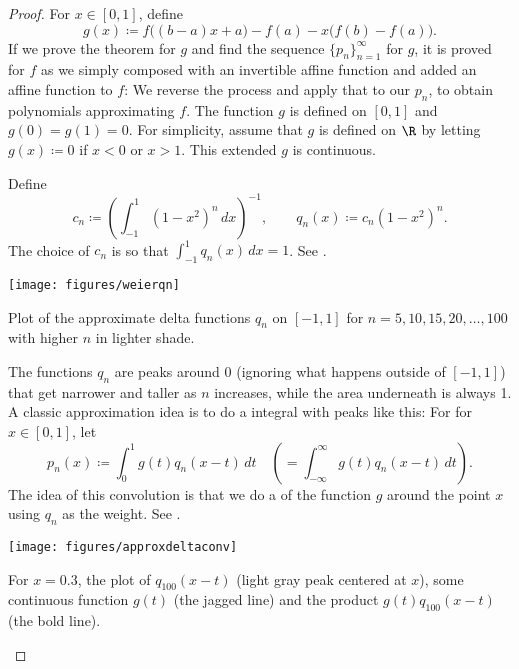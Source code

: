 \begin{proof}
For $x \in [0,1]$,
define
\begin{equation*}
g(x) \coloneqq f\bigl((b-a)x+a\bigr)-f(a) - x\bigl(f(b)-f(a)\bigr) .
\end{equation*}
If we prove the theorem for $g$ and find the sequence
$\{ p_n \}_{n=1}^\infty$ for $g$,
it is proved for $f$ as we simply
composed with an invertible affine function and added an affine
function to $f$:  We reverse the process and apply that to our
$p_n$, to obtain polynomials approximating $f$.
The function $g$ is defined on $[0,1]$ and $g(0)=g(1)=0$.
For simplicity, assume that
$g$ is defined on $\R$ by letting
$g(x) \coloneqq 0$ if $x < 0$ or $x > 1$.  This extended $g$ is continuous.

Define
\begin{equation*}
c_n \coloneqq {\left( \int_{-1}^1 {(1-x^2)}^n\,dx \right)}^{-1} ,
\qquad
q_n(x) \coloneqq c_n (1-x^2)^n .
\end{equation*}
The choice of $c_n$ is
so that $\int_{-1}^1 q_n(x)\,dx = 1$.
See .

\begin{myfigureht}
\texttt{[image: figures/weierqn]}
\caption{Plot of the approximate delta functions $q_n$ on $[-1,1]$ for
$n=5,10,15,20,\ldots,100$ with higher $n$ in lighter shade.\label{fig:weierqn}}
\end{myfigureht}

The functions $q_n$ are peaks around 0 (ignoring what happens outside
of $[-1,1]$) that get narrower and taller as $n$ increases,
while the area underneath is always 1.
A classic approximation idea
is to do a \emph{} integral with peaks like this:
For
for $x \in [0,1]$, let
\begin{equation*}
p_n(x) \coloneqq \int_{0}^1 g(t)q_n(x-t) \,dt \quad \left( = \int_{-\infty}^\infty
g(t)q_n(x-t) \,dt \right) .
\end{equation*}
The idea of this convolution is that we do a  of the
function $g$ around the point $x$ using $q_n$ as the weight.
See .

\begin{myfigureht}
\texttt{[image: figures/approxdeltaconv]}
\caption{For $x=0.3$, the plot of $q_{100}(x-t)$ (light gray peak centered
at $x$), some continuous function
$g(t)$ (the jagged line) and the product $g(t)q_{100}(x-t)$ (the bold line).\label{fig:approxdeltaconv}}
\end{myfigureht}


\end{proof}
